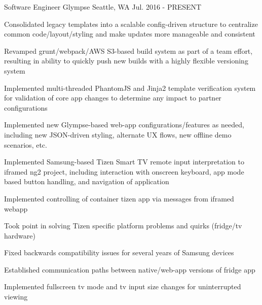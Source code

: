 

\begin{cventries}

  \cventry
    {Software Engineer} %
    {Glympse} %
    {Seattle, WA} %
    {Jul. 2016 - PRESENT} %
    {
      \begin{cvitems} %
        \item {Consolidated legacy templates into a scalable config-driven structure to centralize common code/layout/styling and make updates more manageable and consistent}
        \item {Revamped grunt/webpack/AWS S3-based build system as part of a team effort, resulting in ability to quickly push new builds with a highly flexible versioning system}
        \item {Implemented multi-threaded PhantomJS and Jinja2 template verification system for validation of core app changes to determine any impact to partner configurations}
        \item {Implemented new Glympse-based web-app configurations/features as needed, including new JSON-driven styling, alternate UX flows, new offline demo scenarios, etc.}
        \item {Implemented Samsung-based Tizen Smart TV remote input interpretation to iframed ng2 project, including interaction with onscreen keyboard, app mode based button handling, and navigation of application}
        \item {Implemented controlling of container tizen app via messages from iframed webapp}
        \item {Took point in solving Tizen specific platform problems and quirks (fridge/tv hardware)}
        \item {Fixed backwards compatibility issues for several years of Samsung devices}
        \item {Established communication paths between native/web-app versions of fridge app}
        \item {Implemented fullscreen tv mode and tv input size changes for uninterrupted viewing}

\end{cvitems}}
\end{cventries}
